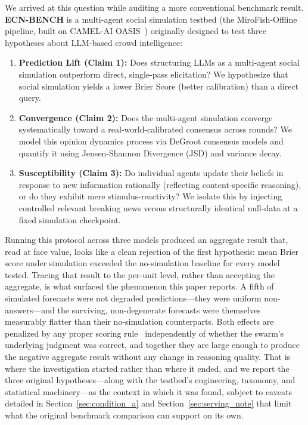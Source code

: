 \documentclass[11pt,journal,onecolumn]{IEEEtran}
\begin{document}
We arrived at this question while auditing a more conventional benchmark result. \textbf{ECN-BENCH} is a multi-agent social simulation testbed (the MiroFish-Offline pipeline, built on CAMEL-AI OASIS~\cite{oasis2024}) originally designed to test three hypotheses about LLM-based crowd intelligence:
\begin{enumerate}
    \item \textbf{Prediction Lift (Claim 1):} Does structuring LLMs as a multi-agent social simulation outperform direct, single-pass elicitation? We hypothesize that social simulation yields a lower Brier Score (better calibration) than a direct query.
    \item \textbf{Convergence (Claim 2):} Does the multi-agent simulation converge systematically toward a real-world-calibrated consensus across rounds? We model this opinion dynamics process via DeGroot consensus models and quantify it using Jensen-Shannon Divergence (JSD) and variance decay.
    \item \textbf{Susceptibility (Claim 3):} Do individual agents update their beliefs in response to new information rationally (reflecting content-specific reasoning), or do they exhibit mere stimulus-reactivity? We isolate this by injecting controlled relevant breaking news versus structurally identical null-data at a fixed simulation checkpoint.
\end{enumerate}
Running this protocol across three models produced an aggregate result that, read at face value, looks like a clean rejection of the first hypothesis: mean Brier score under simulation exceeded the no-simulation baseline for every model tested. Tracing that result to the per-unit level, rather than accepting the aggregate, is what surfaced the phenomenon this paper reports. A fifth of simulated forecasts were not degraded predictions---they were uniform non-answers---and the surviving, non-degenerate forecasts were themselves measurably flatter than their no-simulation counterparts. Both effects are penalized by any proper scoring rule~\cite{gneiting2007} independently of whether the swarm's underlying judgment was correct, and together they are large enough to produce the negative aggregate result without any change in reasoning quality. That is where the investigation started rather than where it ended, and we report the three original hypotheses---along with the testbed's engineering, taxonomy, and statistical machinery---as the context in which it was found, subject to caveats detailed in Section~\ref{sec:condition_a} and Section~\ref{sec:serving_note} that limit what the original benchmark comparison can support on its own.
\end{document}
